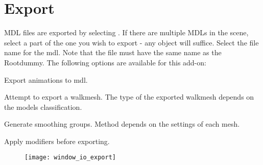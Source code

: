 \section{Export}
MDL files are exported by selecting . If there are multiple MDLs in the scene,
select a part of the one you wish to export - any object will suffice. Select the file name for the mdl. Note that the 
file must have the same name as the Rootdummy. The following options are available for this add-on: 

\begin{description}[leftmargin=12em,style=nextline]
    \item[Export Animations] Export animations to mdl.
    \item[Export Walkmesh] Attempt to export a walkmesh. The type of the exported walkmesh depends on the models classification.
    \item[Export Smooth Groups] Generate smoothing groups. Method depends on the settings of each mesh.
    \item[Apply Modifiers] Apply modifiers before exporting.
\end{description}

\begin{figure}[hb]
    \centering
    \texttt{[image: window\_io\_export]}
\end{figure}

